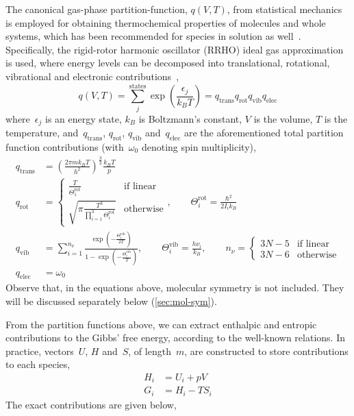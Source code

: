 The canonical gas-phase partition-function,
$q(V,
	T)$,
from statistical mechanics is employed for obtaining thermochemical properties of molecules and whole systems,
which has been recommended for species in solution as well~\cite{Ribeiro_2011}.
Specifically,
the rigid-rotor harmonic oscillator (RRHO) ideal gas approximation is used,
where energy levels can be decomposed into translational,
rotational,
vibrational and electronic contributions~\cite{McQuarrie_1997},
% 
\begin{equation}
	q(V,
	T) = \sum_j^\text{states} \exp \left( \frac{\epsilon_j}{k_B T} \right)
	= q_\text{trans}
	q_\text{rot}
	q_\text{vib}
	q_\text{elec}
\end{equation}
% 
where~$\epsilon_j$ is an energy state,
$k_B$ is Boltzmann's constant,
$V$ is the volume,
$T$ is the temperature,
and~$q_\text{trans}$,
$q_\text{rot}$,
$q_\text{vib}$ and~$q_\text{elec}$ are the aforementioned total partition function contributions (with~$\omega_0$ denoting spin multiplicity),
% 
\begin{equation}
	\begin{split}
		q_\text{trans}
		&= \left(
		\frac{2 \pi m k_B T}{h^2}
		\right)^\frac{3}{2}
		\frac{k_B T}{p} \\
		q_\text{rot}
		&= \begin{cases}
			\frac{T}{\Theta^\text{rot}_1}
			 & \text{if linear} \\
			\sqrt{
				\pi
				\frac{T^3}{
					\prod_{i = 1}^{3} \Theta^\text{rot}_i
				}
			}
			 & \text{otherwise}
		\end{cases},
		\qquad
		\Theta^\text{rot}_i = \frac{\hbar^2}{2 I_i k_B} \\
		q_\text{vib}
		&= \sum_{i = 1}^{n_\nu}
		\frac{
			\exp\left(
			- \frac{\Theta^\text{vib}_i}{2 T}
			\right)
		}{
			1 - \exp\left(
			- \frac{\Theta^\text{vib}_i
			}{T}
			\right)
		},
		\qquad
		\Theta^\text{vib}_i = \frac{h \nu_i}{k_B},
		\qquad
		n_\nu = \begin{cases}
			3 N - 5 & \text{if linear} \\
			3 N - 6 & \text{otherwise}
		\end{cases}
		\\
		q_\text{elec}
		&= \omega_0
	\end{split}
\end{equation}
% 
Observe that,
in the equations above,
molecular symmetry is not included.
They will be discussed separately below (\cref{sec:mol-sym}).

From the partition functions above,
we can extract enthalpic and entropic contributions to the Gibbs' free energy,
according to the well-known relations.
In practice,
vectors~$U$,
$H$ and~$S$,
of length~$m$,
are constructed to store contributions to each species,
% 
\begin{equation}
	\begin{split}
		H_i &= U_i + p V \\
		G_i & = H_i - T S_i
	\end{split}
\end{equation}
% 
The exact contributions are given below,

